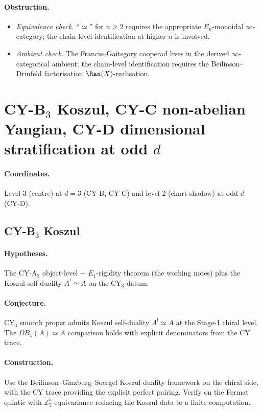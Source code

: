 \paragraph{Obstruction.}
\begin{itemize}[nosep]
\item \emph{Equivalence check.} ``$\simeq$'' for $n \geq 2$ requires
  the appropriate $E_n$-monoidal $\infty$-category; the chain-level
  identification at higher $n$ is involved.
\item \emph{Ambient check.} The Francis--Gaitsgory cooperad lives in
  the derived $\infty$-categorical ambient; the chain-level
  identification requires the Beilinson--Drinfeld factorisation
  $\Ran(X)$-realisation.
\end{itemize}

\section{CY-B$_3$ Koszul, CY-C non-abelian Yangian, CY-D dimensional
stratification at odd $d$}
\label{sec:open-cybcd}

\paragraph{Coordinates.} Level 3 (centre) at $d = 3$ (CY-B, CY-C) and
level 2 (chart-shadow) at odd $d$ (CY-D).

\subsection*{CY-B$_3$ Koszul}

\paragraph{Hypotheses.} The CY-A$_3$ object-level + $E_1$-rigidity
theorem (the working notes) plus the Koszul
self-duality $A^! \simeq A$ on the CY$_3$ datum.

\paragraph{Conjecture.} CY$_3$ smooth proper
admits Koszul self-duality $A^! \simeq A$ at the Stage-1 chiral level.
The $\Omega B_1(A) \simeq A$ comparison holds with explicit denominators
from the CY trace.

\paragraph{Construction.} Use the Beilinson--Ginzburg--Soergel Koszul
duality framework on the chiral side, with the CY trace providing the
explicit perfect pairing. Verify on the Fermat quintic with
$\mathbb{Z}_5^5$-equivariance reducing the Koszul data to a finite
computation.

